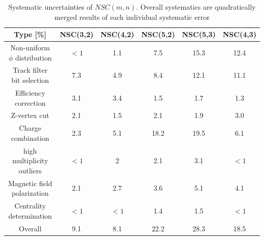 \begin{table}[!p]
\begin{tabular}{c|c|c|c|c|c}
 
  Type  [\%]						&   NSC(3,2)   &  NSC(4,2) & NSC(5,2) & NSC(5,3) & NSC(4,3)\\   \hline  \hline
  Non-uniform $\phi$ distribution	& $<1$	& 1.1	&7.5 	&15.3	&12.4	  	\\ \hline
  Track filter bit selection 		& 7.3	& 4.9	&8.4	&12.1	&11.1	 	\\ \hline
  Efficiency correction				& 3.1	& 3.4	&1.5	&1.7		&1.3	 \\ \hline
  Z-vertex cut						& 2.1	& 1.5	&2.1	&1.9		&3.0		\\ \hline
  Charge combination				& 2.3	& 5.1	&18.2	&19.5	&6.1 	\\ \hline
  high multiplicity outliers			& $<1$	& 2		&2.1	&3.1		&$<1$	\\ \hline
  Magnetic field polarization		& 2.1	& 2.7	&3.6	&5.1		&4.1	 \\ \hline   
  Centrality determination			& $<1$	& $<1$	&1.4	&1.5		&$<1$ 	\\ \hline   \hline
  Overall 							& 9.1	& 8.1	&22.2	&28.3	&18.5
  
\end{tabular}
\caption{Systematic uncertainties of $NSC(m,n)$. Overall systematics are quadratically merged results of each individual systematic error}
\end{table}


